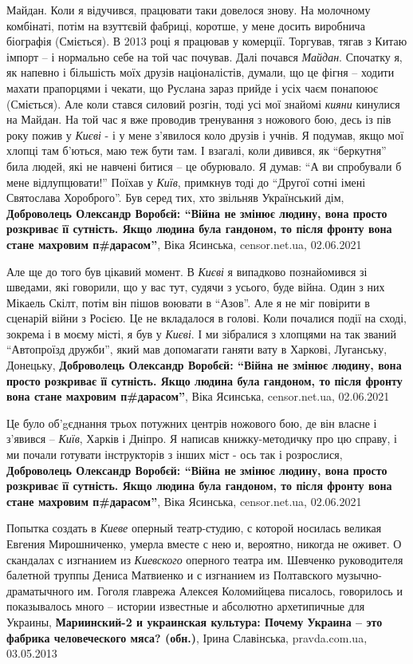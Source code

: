 Майдан. Коли я відучився, працювати таки довелося знову. На молочному
комбінаті, потім на взуттєвій фабриці, коротше, у мене досить виробнича
біографія (Сміється). В 2013 році я працював у комерції. Торгував, тягав з
Китаю імпорт – і нормально себе на той час почував. Далі почався \emph{Майдан}.
Спочатку я, як напевно і більшість моїх друзів націоналістів, думали, що це
фігня – ходити махати прапорцями і чекати, що Руслана зараз прийде і усіх чаєм
понапоює (Сміється). Але коли стався силовий розгін, тоді усі мої знайомі \emph{кияни}
кинулися на Майдан. На той час я вже проводив тренування з ножового бою, десь
із пів року пожив у \emph{Києві} - і у мене з'явилося коло друзів і учнів. Я подумав,
якщо мої хлопці там б'ються, маю теж бути там. І взагалі, коли дивився, як
\enquote{беркутня} била людей, які не навчені битися – це обурювало. Я думав: \enquote{А ви
спробували б мене відлупцювати!} Поїхав у \emph{Київ}, примкнув тоді до \enquote{Другої сотні
імені Святослава Хороброго}. Був серед тих, хто звільняв Український дім,
\textbf{Доброволець Олександр Воробєй: \enquote{Війна не змінює людину, вона
просто розкриває її сутність. Якщо людина була гандоном, то після фронту вона
стане махровим п\#дарасом}},
Віка Ясинська, censor.net.ua, 02.06.2021

Але ще до того був цікавий момент. В \emph{Києві} я випадково познайомився зі
шведами, які говорили, що у вас тут, судячи з усього, буде війна. Один з них
Мікаель Скілт, потім він пішов воювати в \enquote{Азов}. Але я не міг повірити
в сценарій війни з Росією. Це не вкладалося в голові.  Коли почалися події на
сході, зокрема і в моєму місті, я був у \emph{Києві}. І ми зібралися з хлопцями
на так званий \enquote{Автопроїзд дружби}, який мав допомагати ганяти вату в
Харкові, Луганську, Донецьку,
\textbf{Доброволець Олександр Воробєй: \enquote{Війна не змінює людину, вона
просто розкриває її сутність. Якщо людина була гандоном, то після фронту вона
стане махровим п\#дарасом}},
Віка Ясинська, censor.net.ua, 02.06.2021

Це було об'gєднання трьох потужних центрів ножового бою, де він власне і
з'явився – \emph{Київ}, Харків і Дніпро. Я написав книжку-методичку про цю
справу, і ми почали готувати інструкторів з інших міст - ось так і розрослися,
\textbf{Доброволець Олександр Воробєй: \enquote{Війна не змінює людину, вона
просто розкриває її сутність. Якщо людина була гандоном, то після фронту вона
стане махровим п\#дарасом}},
Віка Ясинська, censor.net.ua, 02.06.2021

Попытка создать в \emph{Киеве} оперный театр-студию, с которой носилась великая
Евгения Мирошниченко, умерла вместе с нею и, вероятно, никогда не оживет.  О
скандалах с изгнанием из \emph{Киевского} оперного театра им. Шевченко руководителя
балетной труппы Дениса Матвиенко и с изгнанием из Полтавского
музычно-драматычного им. Гоголя главрежа Алексея Коломийцева писалось,
говорилось и показывалось много – истории известные и абсолютно архетипичные
для Украины,
\textbf{Мариинский-2 и украинская культура: Почему Украина – это фабрика человеческого мяса? (обн.)},
Ірина Славінська, pravda.com.ua, 03.05.2013

